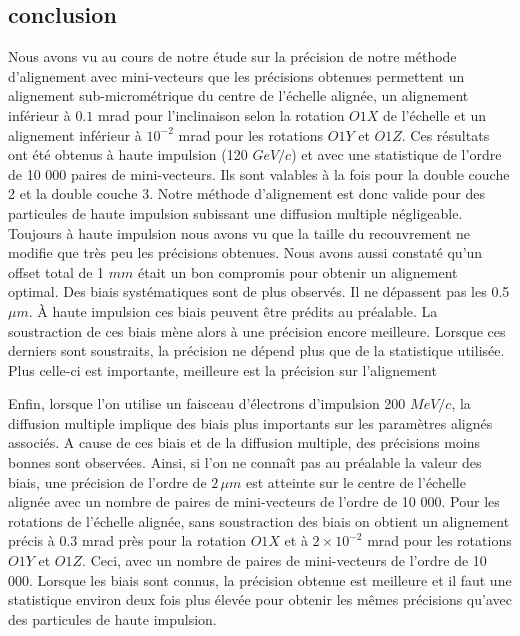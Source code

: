   \FloatBarrier
  
  \subsection{conclusion}
  
  Nous avons vu au cours de notre \'etude sur la pr\'ecision de notre m\'ethode d'alignement avec mini-vecteurs que les pr\'ecisions obtenues permettent un alignement sub-microm\'etrique du centre de l'\'echelle align\'ee, un alignement inf\'erieur \`a $0.1$ mrad pour l'inclinaison selon la rotation $O1X$ de l'\'echelle et un alignement inf\'erieur \`a $10^{-2}$ mrad pour les rotations $O1Y$ et $O1Z$. Ces r\'esultats ont \'et\'e obtenus \`a haute impulsion (120 $GeV/c$) et avec une statistique de l'ordre de 10 000 paires de mini-vecteurs. Ils sont valables \`a la fois pour la double couche 2 et la double couche 3. Notre m\'ethode d'alignement  est donc valide pour des particules de haute impulsion subissant une diffusion multiple n\'egligeable. Toujours \`a haute impulsion nous avons vu que la taille du recouvrement ne modifie que tr\`es peu les pr\'ecisions obtenues. Nous avons aussi constaté qu'un offset total de 1 $mm$ était un bon compromis pour obtenir un alignement optimal. Des biais syst\'ematiques sont de plus observ\'es. Il ne d\'epassent pas les 0.5 $\mu m$. \`A haute impulsion ces biais peuvent \^etre pr\'edits au pr\'ealable. La soustraction de ces biais m\`ene alors \`a une pr\'ecision encore meilleure. Lorsque ces derniers sont soustraits, la pr\'ecision ne d\'epend plus que de la statistique utilis\'ee. Plus celle-ci est importante, meilleure est la pr\'ecision sur l'alignement
  
  \medskip
  
  Enfin, lorsque l'on utilise un faisceau d'\'electrons d'impulsion 200 $MeV/c$, la diffusion multiple implique des biais plus importants sur les param\`etres align\'es associ\'es. A cause de ces biais et de la diffusion multiple, des pr\'ecisions moins bonnes sont observ\'ees. Ainsi, si l'on ne connaît pas au pr\'ealable la valeur des biais, une pr\'ecision de l'ordre de $2 \, \mu m$ est atteinte sur le centre de l'\'echelle align\'ee avec un nombre de paires de mini-vecteurs de l'ordre de 10 000. Pour les rotations de l'\'echelle align\'ee, sans soustraction des biais on obtient un alignement pr\'ecis \`a $0.3$ mrad pr\`es pour la rotation $O1X$ et \`a $2 \times 10^{-2}$ mrad pour les rotations $O1Y$ et $O1Z$. Ceci, avec un nombre de paires de mini-vecteurs de l'ordre de 10 000. Lorsque les biais sont connus, la pr\'ecision obtenue est meilleure et il faut une statistique environ deux fois plus \'elev\'ee pour obtenir les m\^emes pr\'ecisions qu'avec des particules de haute impulsion.
  
